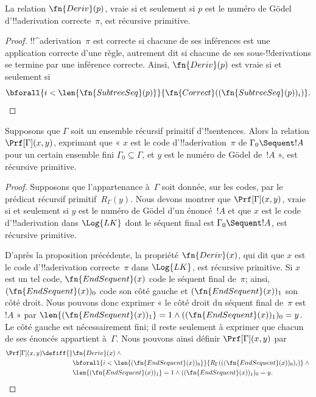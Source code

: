 \documentclass[../../../include/open-logic-section]{subfiles}
\begin{document}
\begin{prop}
  La relation $\fn{Deriv}(p)$, vraie si et seulement si $p$ est le
  numéro de G\"odel d'!!a{derivation} correcte~$\pi$, est
  récursive primitive.
\end{prop}

\begin{proof}
  !!^a{derivation}~$\pi$ est correcte si chacune de ses inférences
  est une application correcte d'une règle, autrement dit si chacune
  de ses sous-!!{derivation}s se termine par une inférence correcte.
  Ainsi, $\fn{Deriv}(p)$ est vraie si et seulement si
  \[
  \bforall{i<\len{\fn{SubtreeSeq}(p)}}{\fn{Correct}((\fn{SubtreeSeq}(p))_i)}.
  \]
\end{proof}

\begin{prop}
Supposons que $\Gamma$ soit un ensemble récursif primitif
d'!!{sentence}s. Alors la relation $\Prf[\Gamma](x, y)$, exprimant
que « $x$ est le code d'!!a{derivation}~$\pi$ de
$\Gamma_0 \Sequent !A$ pour un certain ensemble fini
$\Gamma_0 \subseteq \Gamma$, et $y$ est le numéro de G\"odel de~$!A$ »,
est récursive primitive.
\end{prop}

\begin{proof}
Supposons que l'appartenance à~$\Gamma$ soit donnée, sur les codes,
par le prédicat récursif primitif~$R_\Gamma(y)$. Nous devons montrer
que $\Prf[\Gamma](x, y)$, vraie si et seulement si $y$ est le
numéro de G\"odel d'un énoncé~$!A$ et que $x$ est le code d'!!a{derivation}
dans $\Log{LK}$ dont le séquent final est
$\Gamma_0 \Sequent !A$, est récursive primitive.

D'après la proposition précédente, la propriété $\fn{Deriv}(x)$,
qui dit que $x$ est le code d'!!a{derivation} correcte~$\pi$ dans
$\Log{LK}$, est récursive primitive. Si $x$ est un tel code,
$\fn{EndSequent}(x)$ code le séquent final de~$\pi$; ainsi,
$(\fn{EndSequent}(x))_0$ code son côté gauche et
$(\fn{EndSequent}(x))_1$ son côté droit. Nous pouvons donc exprimer
« le côté droit du séquent final de~$\pi$ est~$!A$ » par
$\len{(\fn{EndSequent}(x))_1} = 1 \land ((\fn{EndSequent}(x))_1)_0 =
y$. Le côté gauche est nécessairement fini; il reste seulement à
exprimer que chacun de ses énoncés appartient à~$\Gamma$. Nous
pouvons ainsi définir $\Prf[\Gamma](x, y)$ par
\begin{align*}
\Prf[\Gamma](x, y) \defiff {}&
\fn{Deriv}(x) \land {} \\
& \bforall{i <
  \len{(\fn{EndSequent}(x))_0}}{R_\Gamma(((\fn{EndSequent}(x))_0)_i)} \land {}\\
& \len{(\fn{EndSequent}(x))_1} = 1 \land ((\fn{EndSequent}(x))_1)_0 = y.
\end{align*}
\end{proof}
\end{document}
